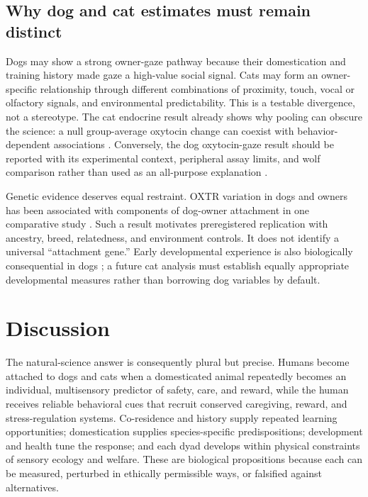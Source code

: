 \documentclass[conference]{IEEEtran}
\begin{document}
\subsection{Why dog and cat estimates must remain distinct}

Dogs may show a strong owner-gaze pathway because their domestication and training history made gaze a high-value social signal. Cats may form an owner-specific relationship through different combinations of proximity, touch, vocal or olfactory signals, and environmental predictability. This is a testable divergence, not a stereotype. The cat endocrine result already shows why pooling can obscure the science: a null group-average oxytocin change can coexist with behavior-dependent associations \cite{johnson2021}. Conversely, the dog oxytocin-gaze result should be reported with its experimental context, peripheral assay limits, and wolf comparison rather than used as an all-purpose explanation \cite{nagasawa2015}.

Genetic evidence deserves equal restraint. OXTR variation in dogs and owners has been associated with components of dog-owner attachment in one comparative study \cite{kovacs2018}. Such a result motivates preregistered replication with ancestry, breed, relatedness, and environment controls. It does not identify a universal ``attachment gene.'' Early developmental experience is also biologically consequential in dogs \cite{dietz2018}; a future cat analysis must establish equally appropriate developmental measures rather than borrowing dog variables by default.

\section{Discussion}

The natural-science answer is consequently plural but precise. Humans become attached to dogs and cats when a domesticated animal repeatedly becomes an individual, multisensory predictor of safety, care, and reward, while the human receives reliable behavioral cues that recruit conserved caregiving, reward, and stress-regulation systems. Co-residence and history supply repeated learning opportunities; domestication supplies species-specific predispositions; development and health tune the response; and each dyad develops within physical constraints of sensory ecology and welfare. These are biological propositions because each can be measured, perturbed in ethically permissible ways, or falsified against alternatives.
\end{document}
